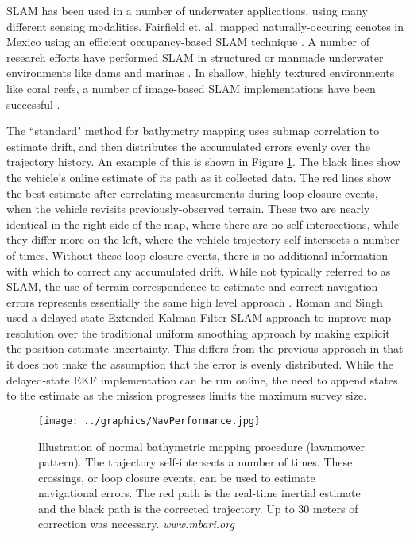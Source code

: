 SLAM has been used in a number of underwater applications, using many different sensing modalities. Fairfield et. al. mapped naturally-occuring cenotes in Mexico using an efficient occupancy-based SLAM technique \cite{Fairfield2007}. A number of research efforts have performed SLAM in structured or manmade underwater environments like dams and marinas \cite{Ribas2008}. In shallow, highly textured environments like coral reefs, a number of image-based SLAM implementations have been successful \cite{Eustice2005}.

The ``standard" method for bathymetry mapping uses submap correlation to estimate drift, and then distributes the accumulated errors evenly over the trajectory history. An example of this is shown in Figure \ref{fig:BathyMapping}. The black lines show the vehicle's online estimate of its path as it collected data. The red lines show the best estimate after correlating measurements during loop closure events, when the vehicle revisits previously-observed terrain. These two are nearly identical in the right side of the map, where there are no self-intersections, while they differ more on the left, where the vehicle trajectory self-intersects a number of times. Without these loop closure events, there is no additional information with which to correct any accumulated drift. While not typically referred to as SLAM, the use of terrain correspondence to estimate and correct navigation errors represents essentially the same high level approach \cite{Henthorn2006}.  Roman and Singh used a delayed-state Extended Kalman Filter SLAM approach to improve map resolution over the traditional uniform smoothing approach by making explicit the position estimate uncertainty\cite{Roman2005}. This differs from the previous approach in that it does not make the assumption that the error is evenly distributed. While the delayed-state EKF implementation can be run online, the need to append states to the estimate as the mission progresses limits the maximum survey size.

 \begin{figure}[!htb]
   \centering
   \texttt{[image: ../graphics/NavPerformance.jpg]} %
   \caption{Illustration of normal bathymetric mapping procedure (lawnmower pattern). The trajectory self-intersects a number of times. These crossings, or loop closure events, can be used to estimate navigational errors. The red path is the real-time inertial estimate and the black path is the corrected trajectory. Up to 30 meters of correction was necessary. \emph{www.mbari.org} }
   \label{fig:BathyMapping}
\end{figure}


